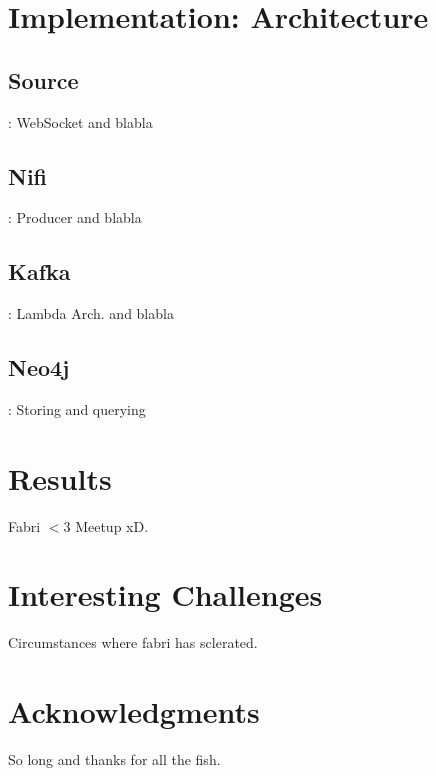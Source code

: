 \documentclass[fleqn,10pt]{SelfArx} %
\begin{document}
\section{Implementation: Architecture}
\subsection{Source}: WebSocket and blabla
\subsection{Nifi}: Producer and blabla
\subsection{Kafka}: Lambda Arch. and blabla
\subsection{Neo4j}: Storing and querying

\section{Results}

Fabri  $<$3 Meetup xD.
\section*{Interesting Challenges}
Circumstances where fabri has sclerated.
\section*{Acknowledgments} %


So long and thanks for all the fish.




\end{document}
